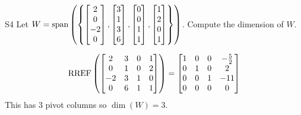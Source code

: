 \documentclass{sbgLAquiz}
\begin{document}
\begin{problem}{S4}  
Let $W={\rm span}\left(\left\{\begin{bmatrix} 2 \\ 0 \\ -2 \\ 0 \end{bmatrix}, \begin{bmatrix} 3 \\ 1 \\ 3 \\ 6 \end{bmatrix}, \begin{bmatrix} 0 \\ 0 \\ 1 \\ 1 \end{bmatrix}, \begin{bmatrix}1 \\ 2 \\ 0 \\ 1 \end{bmatrix}\right\}\right)$. Compute the dimension of $W$.
\end{problem}
\begin{solution}
$$\operatorname{RREF}\left( \begin{bmatrix} 2 & 3 & 0 & 1 \\ 0 & 1 & 0 & 2 \\ -2 & 3 & 1 & 0 \\ 0 & 6 & 1 & 1\end{bmatrix} \right) = \begin{bmatrix}1 & 0 & 0 & -\frac{5}{2} \\ 0 & 1 & 0 & 2 \\ 0 & 0 & 1 & -11\\ 0 & 0 & 0 & 0  \end{bmatrix} $$
This has 3 pivot columns so  $\dim(W) =3$.
\end{solution}
\end{document}
